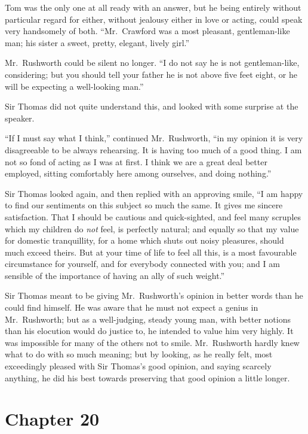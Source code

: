 Tom was the only one at all ready with an answer, but he
being entirely without particular regard for either,
without jealousy either in love or acting, could speak
very handsomely of both.  ``Mr.\ Crawford was a most pleasant,
gentleman-like man; his sister a sweet, pretty, elegant,
lively girl.''

Mr.\ Rushworth could be silent no longer.  ``I do not say
he is not gentleman-like, considering; but you should
tell your father he is not above five feet eight,
or he will be expecting a well-looking man.''

Sir Thomas did not quite understand this, and looked
with some surprise at the speaker.

``If I must say what I think,'' continued Mr.\ Rushworth, ``in my
opinion it is very disagreeable to be always rehearsing.
It is having too much of a good thing.  I am not so fond
of acting as I was at first.  I think we are a great deal
better employed, sitting comfortably here among ourselves,
and doing nothing.''

Sir Thomas looked again, and then replied with an approving
smile, ``I am happy to find our sentiments on this subject
so much the same.  It gives me sincere satisfaction.
That I should be cautious and quick-sighted, and feel many
scruples which my children do \emph{not} feel, is perfectly natural;
and equally so that my value for domestic tranquillity,
for a home which shuts out noisy pleasures, should much
exceed theirs.  But at your time of life to feel all this,
is a most favourable circumstance for yourself,
and for everybody connected with you; and I am sensible
of the importance of having an ally of such weight.''

Sir Thomas meant to be giving Mr.\ Rushworth's opinion
in better words than he could find himself.  He was
aware that he must not expect a genius in Mr.\ Rushworth;
but as a well-judging, steady young man, with better notions
than his elocution would do justice to, he intended to value
him very highly.  It was impossible for many of the others
not to smile.  Mr.\ Rushworth hardly knew what to do
with so much meaning; but by looking, as he really felt,
most exceedingly pleased with Sir Thomas's good opinion,
and saying scarcely anything, he did his best towards
preserving that good opinion a little longer.



\chapter{Chapter 20}


